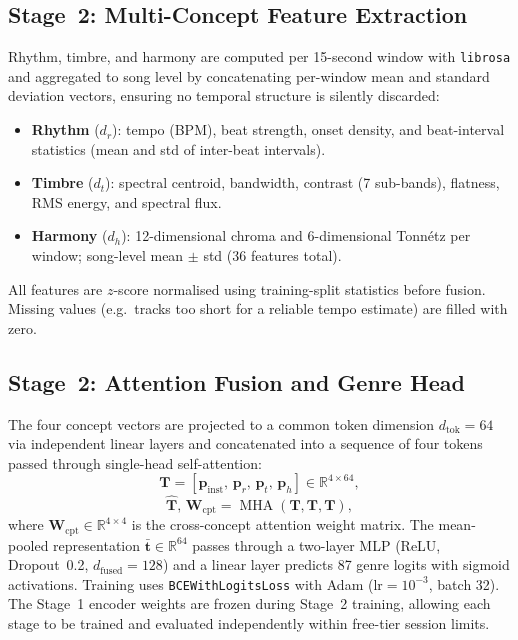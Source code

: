 \documentclass[sigconf,nonacm]{acmart}
\begin{document}
\subsection{Stage~2: Multi-Concept Feature Extraction}

Rhythm, timbre, and harmony are computed per 15-second window with \texttt{librosa} and
aggregated to song level by concatenating per-window mean and standard deviation vectors,
ensuring no temporal structure is silently discarded:
\begin{itemize}[leftmargin=*,nosep]
  \item \textbf{Rhythm} ($d_r$): tempo (BPM), beat strength, onset density, and beat-interval
        statistics (mean and std of inter-beat intervals).
  \item \textbf{Timbre} ($d_t$): spectral centroid, bandwidth, contrast (7 sub-bands),
        flatness, RMS energy, and spectral flux.
  \item \textbf{Harmony} ($d_h$): 12-dimensional chroma and 6-dimensional Tonn\'{e}tz per
        window; song-level mean $\pm$ std (36 features total).
\end{itemize}
All features are $z$-score normalised using training-split statistics before fusion. Missing
values (e.g.\ tracks too short for a reliable tempo estimate) are filled with zero.

\subsection{Stage~2: Attention Fusion and Genre Head}

The four concept vectors are projected to a common token dimension $d_{\text{tok}}=64$ via
independent linear layers and concatenated into a sequence of four tokens passed through
single-head self-attention:
\begin{equation}
  \mathbf{T} = [\mathbf{p}_{\text{inst}},\,\mathbf{p}_r,\,\mathbf{p}_t,\,\mathbf{p}_h]
               \in\mathbb{R}^{4\times64},
\end{equation}
\begin{equation}
  \hat{\mathbf{T}},\,\mathbf{W}_{\!\text{cpt}} = \operatorname{MHA}(\mathbf{T},\mathbf{T},\mathbf{T}),
\end{equation}
where $\mathbf{W}_{\!\text{cpt}}\in\mathbb{R}^{4\times4}$ is the cross-concept attention weight
matrix. The mean-pooled representation $\bar{\mathbf{t}}\in\mathbb{R}^{64}$ passes through a
two-layer MLP (ReLU, Dropout~0.2, $d_{\text{fused}}=128$) and a linear layer predicts 87 genre
logits with sigmoid activations. Training uses \texttt{BCEWithLogitsLoss} with Adam
(lr$=10^{-3}$, batch 32). The Stage~1 encoder weights are frozen during Stage~2 training,
allowing each stage to be trained and evaluated independently within free-tier session limits.
\end{document}

